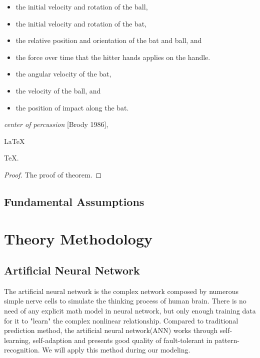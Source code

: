 \documentclass{mcmthesis}
\begin{document}
\begin{itemize}
\item the initial velocity and rotation of the ball,
\item the initial velocity and rotation of the bat,
\item the relative position and orientation of the bat and ball, and
\item the force over time that the hitter hands applies on the handle.
\end{itemize}




\begin{itemize}

\item the angular velocity of the bat,
\item the velocity of the ball, and
\item the position of impact along the bat.
\end{itemize}

\emph{center of percussion} [Brody 1986], \lipsum[5]



\begin{Theorem} \label{thm:latex}
\LaTeX
\end{Theorem}
\begin{Lemma} \label{thm:tex}
\TeX .
\end{Lemma}
\begin{proof}
The proof of theorem.
\end{proof}


\subsection{Fundamental Assumptions}

\section{Theory Methodology}
\subsection{Artificial Neural Network}

The artificial neural network is the complex network composed by numerous simple nerve cells to simulate the thinking process of human brain. There is no need of any explicit math model in neural network, but only enough training data for it to "learn" the complex nonlinear relationship. Compared to traditional prediction method, the artificial neural network(ANN) works through self-learning, self-adaption and presents good quality of fault-tolerant in pattern-recognition. We will apply this method during our modeling. 
\end{document}
